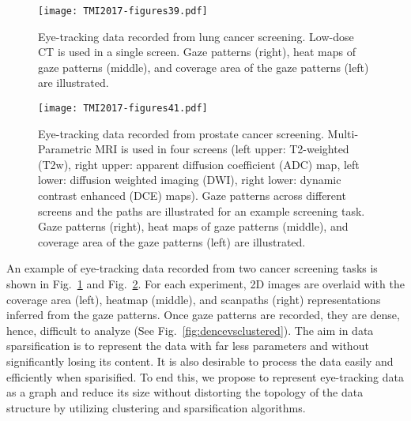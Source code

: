 \documentclass[preprint,12pt]{elsarticle}
\begin{document}
\begin{figure}[h]
\centering
\texttt{[image: TMI2017-figures39.pdf]}
\caption{Eye-tracking data recorded from lung cancer screening. Low-dose CT is used in a single screen. Gaze patterns (right), heat maps of gaze patterns (middle), and coverage area of the gaze patterns (left) are illustrated. \label{fig:data1}}
\end{figure}

\begin{figure}[h]
\centering
\texttt{[image: TMI2017-figures41.pdf]}
\caption{Eye-tracking data recorded from prostate cancer screening. Multi-Parametric MRI is used in four screens (left upper: T2-weighted (T2w), right upper: apparent diffusion coefficient (ADC) map, left lower: diffusion weighted imaging (DWI), right lower: dynamic contrast enhanced (DCE) maps). Gaze patterns across different screens and the paths are illustrated for an example screening task. Gaze patterns (right), heat maps of gaze patterns (middle), and coverage area of the gaze patterns (left) are illustrated. \label{fig:data2}}
\end{figure}

An example of eye-tracking data recorded from two cancer screening tasks is shown in Fig.~\ref{fig:data1} and Fig.~\ref{fig:data2}. For each experiment, 2D images are overlaid with the coverage area (left), heatmap (middle), and scanpaths (right) representations inferred from the gaze patterns. Once gaze patterns are recorded, they are dense, hence, difficult to analyze (See Fig.~\ref{fig:dencevsclustered}). The aim in data sparsification is to represent the data with far less parameters and without significantly losing its content. It is also desirable to process the data easily and efficiently when sparisified. To end this, we propose to represent eye-tracking data as a graph and reduce its size without distorting the topology of the data structure by utilizing clustering and sparsification algorithms.
\end{document}
